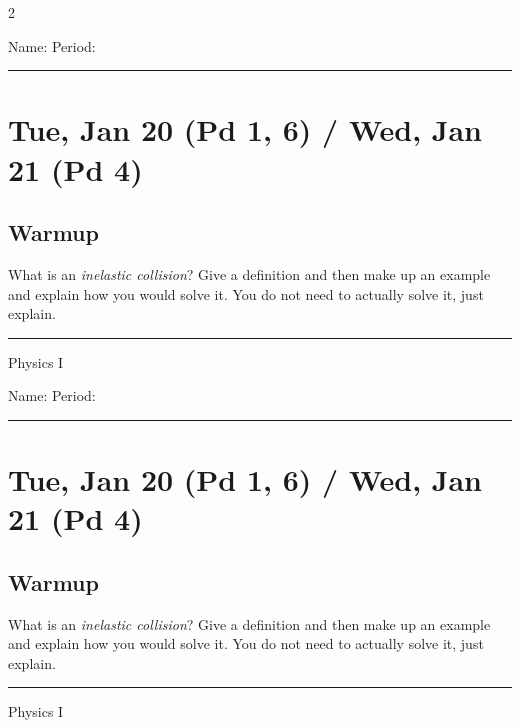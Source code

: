 \documentclass[10pt,landscape]{exam}
\def\todayDate{Tue, Jan 20 (Pd 1, 6) / Wed, Jan 21 (Pd 4)}
\def\content{

What is an \emph{inelastic collision}?  Give a definition and then make up an example and explain how you would solve it.  You do not need to actually solve it, just explain.

}
\begin{document}
\pagestyle{empty}

\setlength{\columnsep}{0.8in}
\begin{multicols*}{2}

\noindent  
Name: \hfill Period: \hspace{5em}
\vspace{0.5em}
\hrule

\section*{\todayDate}
\subsection*{Warmup}

\content

\vfill
\hrule
\vspace{0.5em}
\hfill {\sc Physics I}

\columnbreak

\noindent  
Name: \hfill Period: \hspace{5em}
\vspace{0.5em}
\hrule

\section*{\todayDate}
\subsection*{Warmup}

\content

\vfill
\hrule
\vspace{0.5em}
\hfill {\sc Physics I}

\end{multicols*}
\end{document}
